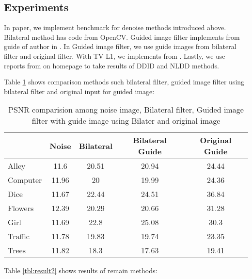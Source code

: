 
\subsection{Experiments}

In paper, we implement benchmark for denoise methods introduced above. Bilateral method has code from OpenCV. Guided image filter implements from guide of author in \cite{He2013}. In Guided image filter, we use guide images from bilateral filter and original filter. With TV-L1, we implements from \cite{Znah2013}. Lastly, we use reports from \cite{Pierazzo2014} on homepage to take results of DDID and NLDD methods.

Table \ref{tbl:result1} shows comparison methods such bilateral filter, guided image filter using bilateral filter and original input for guided image:

\begin{table}[ht]
	\centering
	\caption{PSNR comparision among noise image, Bilateral filter, Guided image filter with guide image using Bilater and original image}
	\label{tbl:result1}
	\begin{tabular}{|l|c|c|c|c|}
		\hline
		& \cellcolor[HTML]{C0C0C0}\textbf{Noise} 
		& \cellcolor[HTML]{C0C0C0}\textbf{Bilateral } 
		& \cellcolor[HTML]{C0C0C0}\textbf{Bilateral Guide} 
		& \cellcolor[HTML]{C0C0C0}\textbf{Original Guide} \\ 		
		\hline
		Alley &11.6 &20.51 &20.94 &24.44 \\ \hline
		Computer &11.96 &20 &19.99 &24.36 \\ \hline
		Dice &11.67 &22.44 &24.51 &36.84 \\ \hline
		Flowers & 12.39 & 20.29 & 20.66 & 31.28 \\ \hline
		Girl &11.69 &22.8 &25.08 &30.3 \\ \hline
		Traffic &11.78 &19.83 &19.74 &23.35 \\ \hline
		Trees &11.82 &18.3 &17.63 &19.41 \\ \hline
	\end{tabular}
\end{table}

Table \ref{tbl:result2} shows results of remain methods:

